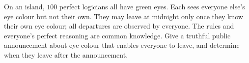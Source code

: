 On an island, $100$ perfect logicians all have green eyes. Each sees everyone else's eye colour but not their own. They may leave at midnight only once they know their own eye colour; all departures are observed by everyone. The rules and everyone's perfect reasoning are common knowledge. Give a truthful public announcement about eye colour that enables everyone to leave, and determine when they leave after the announcement.
